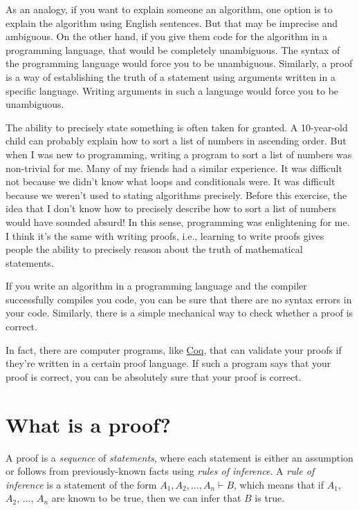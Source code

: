 As an analogy, if you want to explain someone an algorithm,
one option is to explain the algorithm using English sentences.
But that may be imprecise and ambiguous.
On the other hand, if you give them code for the algorithm in a
programming language, that would be completely unambiguous.
The syntax of the programming language would force you to be unambiguous.
Similarly, a proof is a way of establishing the truth of a statement
using arguments written in a specific language.
Writing arguments in such a language would force you to be unambiguous.

The ability to precisely state something is often taken for granted.
A 10-year-old child can probably explain how to sort a list of numbers in ascending order.
But when I was new to programming, writing a program to sort a list of numbers
was non-trivial for me. Many of my friends had a similar experience.
It was difficult not because we didn't know what loops and conditionals were.
It was difficult because we weren't used to stating algorithms precisely.
Before this exercise, the idea that I don't know how to precisely describe
how to sort a list of numbers would have sounded absurd!
In this sense, programming was enlightening for me.
I think it's the same with writing proofs, i.e.,
learning to write proofs gives people the ability
to precisely reason about the truth of mathematical statements.

If you write an algorithm in a programming language and
the compiler successfully compiles you code,
you can be sure that there are no syntax errors in your code.
Similarly, there is a simple mechanical way to check whether a proof is correct.

In fact, there are computer programs, like \href{https://coq.inria.fr/}{Coq},
that can validate your proofs if they're written in a certain proof language.
If such a program says that your proof is correct,
you can be absolutely sure that your proof is correct.

\section{What is a proof?}

A proof is a \emph{sequence} of \emph{statements}, where each statement is
either an assumption or follows from previously-known facts using \emph{rules of inference}.
A \emph{rule of inference} is a statement of the form $A_1, A_2, \ldots, A_n \vdash B$,
which means that if $A_1$, $A_2$, $\ldots$, $A_n$ are known to be true,
then we can infer that $B$ is true.

